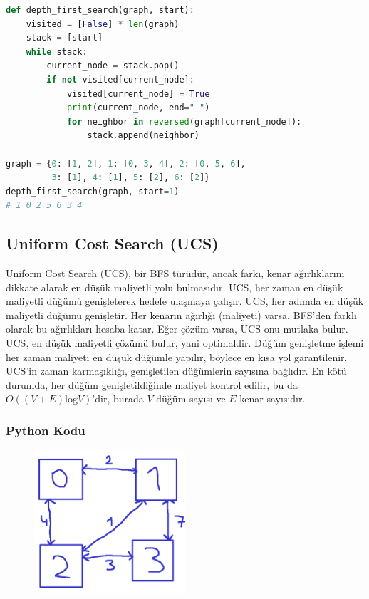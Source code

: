 \begin{lstlisting}[language=Python]
def depth_first_search(graph, start):
    visited = [False] * len(graph)
    stack = [start]
    while stack:
        current_node = stack.pop()
        if not visited[current_node]:
            visited[current_node] = True
            print(current_node, end=" ")
            for neighbor in reversed(graph[current_node]):
                stack.append(neighbor)

graph = {0: [1, 2], 1: [0, 3, 4], 2: [0, 5, 6],
         3: [1], 4: [1], 5: [2], 6: [2]}
depth_first_search(graph, start=1)
# 1 0 2 5 6 3 4 
\end{lstlisting}

\newpage

\subsection{Uniform Cost Search (UCS)}

Uniform Cost Search (UCS), bir BFS türüdür, ancak farkı, kenar ağırlıklarını dikkate alarak en düşük maliyetli yolu bulmasıdır. UCS, her zaman en düşük maliyetli düğümü genişleterek hedefe ulaşmaya çalışır. UCS, her adımda en düşük maliyetli düğümü genişletir. Her kenarın ağırlığı (maliyeti) varsa, BFS'den farklı olarak bu ağırlıkları hesaba katar. Eğer çözüm varsa, UCS onu mutlaka bulur. UCS, en düşük maliyetli çözümü bulur, yani optimaldir. Düğüm genişletme işlemi her zaman maliyeti en düşük düğümle yapılır, böylece en kısa yol garantilenir. UCS'in zaman karmaşıklığı, genişletilen düğümlerin sayısına bağlıdır. En kötü durumda, her düğüm genişletildiğinde maliyet kontrol edilir, bu da $O((V + E) \text{log}V)$'dir, burada $V$ düğüm sayısı ve $E$ kenar sayısıdır.

\subsubsection{Python Kodu}

\begin{figure}[h]
    \centering
    \includegraphics[width=0.5\textwidth]{images/ucs.png}
    \caption{}
\end{figure}

